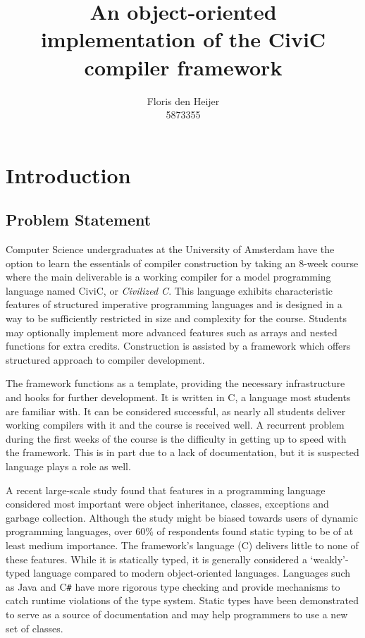 \documentclass[twoside,openright]{uva-bachelor-thesis}
\title{An object-oriented \\implementation of the CiviC compiler framework}
\author{Floris den Heijer\\5873355}
\newcommand{\cs}{C\texttt{\#}\xspace}
\begin{document}
\maketitle
\begin{abstract}
	\lipsum
\end{abstract}

\tableofcontents


\chapter{Introduction}
	\section{Problem Statement}
		Computer Science undergraduates at the University of Amsterdam have the option to learn the essentials of compiler construction by taking an 8-week course where the main deliverable is a working compiler for a model programming language named CiviC, or \emph{Civilized C}. This language exhibits characteristic features of structured imperative programming languages and is designed in a way to be sufficiently restricted in size and complexity for the course. Students may optionally implement more advanced features such as arrays and nested functions for extra credits. Construction is assisted by a framework which offers structured approach to compiler development.
		
		The framework functions as a template, providing the necessary infrastructure and hooks for further development. It is written in C, a language most students are familiar with. It can be considered successful, as nearly all students deliver working compilers with it and the course is received well. A recurrent problem during the first weeks of the course is the difficulty in getting up to speed with the framework. This is in part due to a lack of documentation, but it is suspected language plays a role as well. 
		
		A recent large-scale study found that features in a programming language considered most important were object inheritance, classes, exceptions and garbage collection\cite{Meyerovich2013}. Although the study might be biased towards users of dynamic programming languages, over 60\% of respondents found static typing to be of at least medium importance. The framework's language (C) delivers little to none of these features. While it is statically typed, it is generally considered a `weakly'-typed language compared to modern object-oriented languages. Languages such as Java and \cs have more rigorous type checking and provide mechanisms to catch runtime violations of the type system. Static types have been demonstrated to serve as a source of documentation and may help programmers to use a new set of classes\cite{Hanenberg2014}.
		
\end{document}
